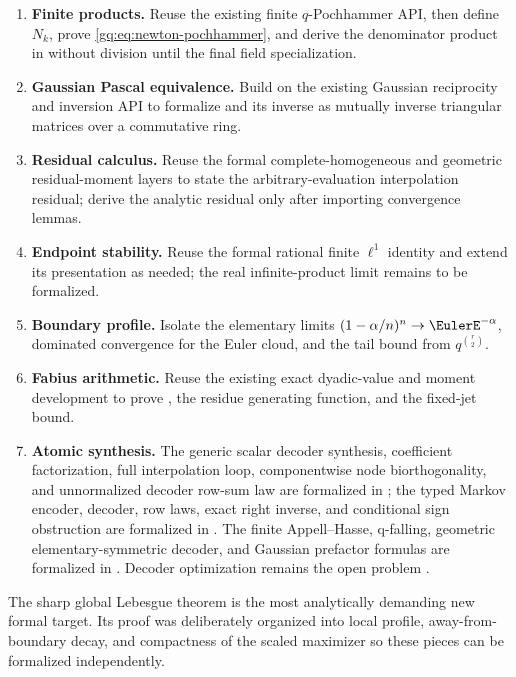 \begin{enumerate}
\item \textbf{Finite products.}  Reuse the existing finite $q$-Pochhammer
      API, then define $N_k$, prove
      \eqref{gq:eq:newton-pochhammer}, and derive the denominator product in
       without division until the final
      field specialization.
\item \textbf{Gaussian Pascal equivalence.}  Build on the existing Gaussian
      reciprocity and inversion API to formalize
       and its inverse as mutually inverse
      triangular matrices over a commutative ring.
\item \textbf{Residual calculus.}  Reuse the formal complete-homogeneous and
      geometric residual-moment layers to state the arbitrary-evaluation
      interpolation residual; derive the analytic residual only after
      importing convergence lemmas.
\item \textbf{Endpoint stability.}  Reuse the formal rational finite
      $\ell^1$ identity and extend its presentation as needed; the real
      infinite-product limit remains to be formalized.
\item \textbf{Boundary profile.}  Isolate the elementary limits
      $(1-\alpha/n)^n\to\EulerE^{-\alpha}$, dominated convergence for the Euler
      cloud, and the tail bound from $q^{\binom r2}$.
\item \textbf{Fabius arithmetic.}  Reuse the existing exact dyadic-value and
      moment development to prove , the
      residue generating function, and the fixed-jet bound.
\item \textbf{Atomic synthesis.}  The generic scalar decoder synthesis,
      coefficient factorization, full interpolation loop, componentwise node
      biorthogonality, and unnormalized decoder row-sum law are formalized in
      ; the typed Markov encoder,
      decoder, row laws, exact right inverse, and conditional sign obstruction
      are formalized in .  The
      finite Appell--Hasse, q-falling, geometric elementary-symmetric decoder,
      and Gaussian prefactor formulas are formalized in
      .  Decoder optimization remains the open problem
      .
\end{enumerate}

The sharp global Lebesgue theorem is the most analytically demanding new
formal target.  Its proof was deliberately organized into local profile,
away-from-boundary decay, and compactness of the scaled maximizer so these
pieces can be formalized independently.
